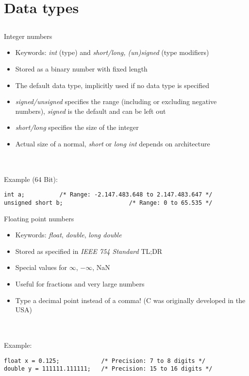 \section{Data types}
\subsection{}
\begin{frame}[fragile]{Integer numbers}
	\begin{itemize}
		\item Keywords: \textit{int} (type) and \textit{short/long, (un)signed} (type
		 modifiers)
		\item Stored as a binary number with fixed length
		\item The default data type, implicitly used if no data type is specified
		\item \textit{signed/unsigned} specifies the range (including or excluding
		 negative numbers), \textit{signed} is the default and can be left out
		\item \textit{short/long} specifies the size of the integer
		\item Actual size of a normal, \textit{short} or \textit{long int} depends on
		 architecture
	\end{itemize}\ \\
	\ \\
	Example (64 Bit):
	\begin{lstlisting}[numbers=none]
int a;			/* Range: -2.147.483.648 to 2.147.483.647 */
unsigned short b;					/* Range: 0 to 65.535 */
\end{lstlisting}
\end{frame}
\begin{frame}[fragile]{Floating point numbers}
	\begin{itemize}
		\item Keywords: \textit{float}, \textit{double}, \textit{long double}
		\item Stored as specified in \textit{IEEE 754 Standard} TL;DR
		\item Special values for $\infty$, $-\infty$, NaN
		\item Useful for fractions and very large numbers
		\item Type a decimal point instead of a comma! (C was originally developed
		 in the USA)
	\end{itemize}\ \\
	\ \\
	Example:
	\begin{lstlisting}[numbers=none]
float x = 0.125;			/* Precision: 7 to 8 digits */
double y = 111111.111111;	/* Precision: 15 to 16 digits */
\end{lstlisting}
\end{frame}
